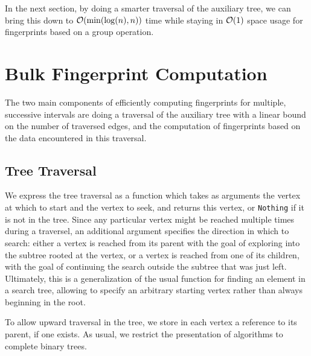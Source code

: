 In the next section, by doing a smarter traversal of the auxiliary tree, we can bring this down to $\mathcal{O}(\min(\log(n), n))$ time while staying in $\mathcal{O}(1)$ space usage for fingerprints based on a group operation.

\section{Bulk Fingerprint Computation}

The two main components of efficiently computing fingerprints for multiple, successive intervals are doing a traversal of the auxiliary tree with a linear bound on the number of traversed edges, and the computation of fingerprints based on the data encountered in this traversal.

\subsection{Tree Traversal}

We express the tree traversal as a function which takes as arguments the vertex at which to start and the vertex to seek, and returns this vertex, or \texttt{Nothing} if it is not in the tree. Since any particular vertex might be reached multiple times during a traversel, an additional argument specifies the direction in which to search: either a vertex is reached from its parent with the goal of exploring into the subtree rooted at the vertex, or a vertex is reached from one of its children, with the goal of continuing the search outside the subtree that was just left. Ultimately, this is a generalization of the usual function for finding an element in a search tree, allowing to specify an arbitrary starting vertex rather than always beginning in the root.

To allow upward traversal in the tree, we store in each vertex a reference to its parent, if one exists. As usual, we restrict the presentation of algorithms to complete binary trees.

